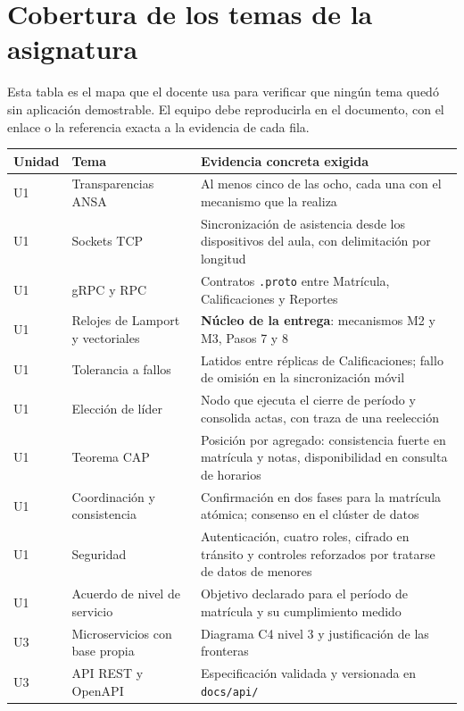 \documentclass[11pt,a4paper]{article}
\begin{document}
	\section{Cobertura de los temas de la asignatura}
	
	Esta tabla es el mapa que el docente usa para verificar que ningún tema quedó sin aplicación demostrable. El equipo debe reproducirla en el documento, con el enlace o la referencia exacta a la evidencia de cada fila.
	
	\begin{center}
		\footnotesize
		\begin{longtable}{@{}p{1.1cm}p{4.9cm}p{8.9cm}@{}}
			\toprule
			\textbf{Unidad} & \textbf{Tema} & \textbf{Evidencia concreta exigida} \\
			\midrule
			\endhead
			U1 & Transparencias ANSA & Al menos cinco de las ocho, cada una con el mecanismo que la realiza \\
			U1 & Sockets TCP & Sincronización de asistencia desde los dispositivos del aula, con delimitación por longitud \\
			U1 & gRPC y RPC & Contratos \texttt{.proto} entre Matrícula, Calificaciones y Reportes \\
			U1 & Relojes de Lamport y vectoriales & \textbf{Núcleo de la entrega}: mecanismos M2 y M3, Pasos 7 y 8 \\
			U1 & Tolerancia a fallos & Latidos entre réplicas de Calificaciones; fallo de omisión en la sincronización móvil \\
			U1 & Elección de líder & Nodo que ejecuta el cierre de período y consolida actas, con traza de una reelección \\
			U1 & Teorema CAP & Posición por agregado: consistencia fuerte en matrícula y notas, disponibilidad en consulta de horarios \\
			U1 & Coordinación y consistencia & Confirmación en dos fases para la matrícula atómica; consenso en el clúster de datos \\
			U1 & Seguridad & Autenticación, cuatro roles, cifrado en tránsito y controles reforzados por tratarse de datos de menores \\
			U1 & Acuerdo de nivel de servicio & Objetivo declarado para el período de matrícula y su cumplimiento medido \\
			U3 & Microservicios con base propia & Diagrama C4 nivel 3 y justificación de las fronteras \\
			U3 & API REST y OpenAPI & Especificación validada y versionada en \texttt{docs/api/} \\

\end{longtable}
\end{center}
\end{document}
